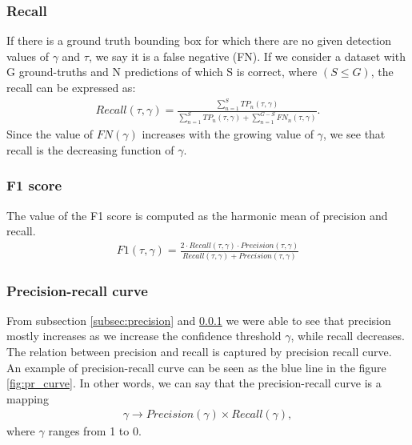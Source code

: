 \subsubsection{Recall}
\label{subsec:recall}
If there is a ground truth bounding box for which there are no given detection values of $\gamma$ and $\tau$, we say it is a false negative (FN). If we consider a dataset with G ground-truths and N predictions of which S is correct, where $(S \leq G)$, the recall can be expressed as:
\begin{align}
    Recall(\tau, \gamma) = \frac{\sum_{n=1}^S TP_n(\tau, \gamma)}{\sum_{n=1}^S TP_n(\tau, \gamma) + \sum_{n=1}^{G-S} FN_n(\tau, \gamma)}.
\end{align}
Since the value of $FN(\gamma)$ increases with the growing value of $\gamma$, we see that recall is the decreasing function of $\gamma$.
\subsubsection{F1 score}
The value of the F1 score is computed as the harmonic mean of precision and recall.
\begin{align}
    F1(\tau, \gamma) = \frac{2 \cdot Recall(\tau,\gamma) \cdot Precision(\tau, \gamma)}{Recall(\tau,\gamma) + Precision(\tau, \gamma)}
\end{align}

\subsubsection{Precision-recall curve}
From subsection \ref{subsec:precision} and \ref{subsec:recall} we were able to see that precision mostly increases as we increase the confidence threshold $\gamma$, while recall decreases. The relation between precision and recall is captured by precision recall curve. An example of precision-recall curve can be seen as the blue line in the figure \ref{fig:pr_curve}. In other words, we can say that the precision-recall curve is a mapping
\begin{align}
    \gamma \rightarrow Precision(\gamma) \times  Recall(\gamma),
    \label{eq:pr_curve}
\end{align}
where $\gamma$ ranges from 1 to 0.


